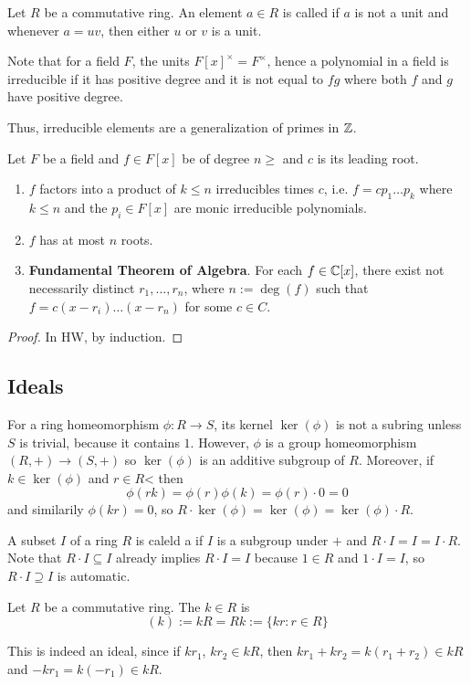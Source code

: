 \begin{defbox}
    Let $R$ be a commutative ring. An element $a \in R$ is called  if $a$ is not a unit and whenever $a = uv$, then either $u$ or $v$ is a unit.
\end{defbox}

Note that for a field $F$, the units $F[x]^\times = F^\times$, hence a polynomial in a field is irreducible if it has positive degree and it is not equal to $fg$ where both $f$ and $g$ have positive degree.

Thus, irreducible elements are a generalization of primes in $\mathbb{Z}$.

\begin{propbox}
    Let $F$ be a field and $f \in F[x]$ be of degree $n \geq $ and $c$ is its leading root.
    \begin{enumerate}
        \item $f$ factors into a product of $k \leq n$ irreducibles times $c$, i.e. $f = cp_1\dots p_k$ where $k \leq n$ and the $p_i \in F[x]$ are monic irreducible polynomials.
        \item $f$ has at most $n$ roots.
        \item \textbf{Fundamental Theorem of Algebra}. For each $f \in \mathbb{C}[x]$, there exist not necessarily distinct $r_1, \dots, r_n$, where $n := \deg(f)$ such that $f = c(x-r_i)\dots(x-r_n)$ for some $c \in C$. 
    \end{enumerate}
\end{propbox}

\begin{proof}
    In HW, by induction.
\end{proof}

\subsection{Ideals}

For a ring homeomorphism $\phi \colon R \to S$, its kernel $\ker(\phi)$ is not a subring unless $S$ is trivial, because it contains $1$. However, $\phi$ is a group homeomorphism $(R, +) \to (S, +)$ so $\ker(\phi)$ is an additive subgroup of $R$. Moreover, if $k \in \ker(\phi)$ and $r \in R$< then 
    \[ \phi(rk) = \phi(r)\phi(k) = \phi(r) \cdot 0 = 0 \]
and similarily $\phi(kr) = 0$, so $R \cdot \ker(\phi) = \ker(\phi) = \ker(\phi) \cdot R$. 

\begin{defbox}
    A subset $I$ of a ring $R$ is caleld a  if $I$ is a subgroup under $+$ and $R \cdot I = I = I \cdot R$. Note that $R \cdot I \subseteq I$ already implies $R \cdot I = I$ because $1 \in R$ and $1 \cdot I = I$, so $R \cdot I \supseteq I$ is automatic.
\end{defbox}

\begin{defbox}
    Let $R$ be a commutative ring. The  $k \in R$ is 
    \[ (k) := kR = Rk := \{kr : r \in R\} \]
\end{defbox}

This is indeed an ideal, since if $kr_1$, $kr_2 \in kR$, then $kr_1 + kr_2 = k(r_1 + r_2) \in kR$ and $-kr_1 = k(-r_1) \in kR$. 